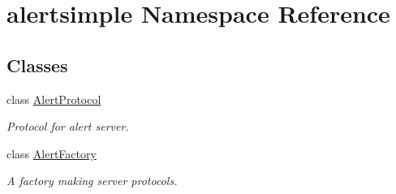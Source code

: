 \hypertarget{namespacealertsimple}{\section{alertsimple Namespace Reference}
\label{namespacealertsimple}
}
\subsection*{Classes}
\begin{DoxyCompactItemize}
\item 
class \hyperlink{classalertsimple_1_1_alert_protocol}{Alert\-Protocol}
\begin{DoxyCompactList}\small\item\em Protocol for alert server. \end{DoxyCompactList}\item 
class \hyperlink{classalertsimple_1_1_alert_factory}{Alert\-Factory}
\begin{DoxyCompactList}\small\item\em A factory making server protocols. \end{DoxyCompactList}\end{DoxyCompactItemize}
